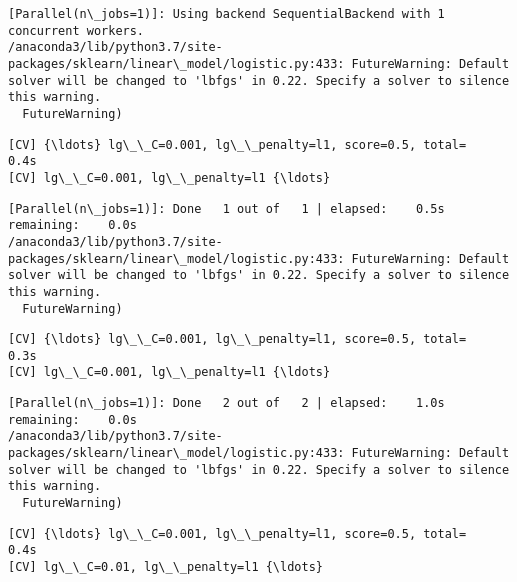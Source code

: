 \documentclass[11pt]{article}
\begin{document}
    \begin{Verbatim}[commandchars=\\\{\}]
[Parallel(n\_jobs=1)]: Using backend SequentialBackend with 1 concurrent workers.
/anaconda3/lib/python3.7/site-packages/sklearn/linear\_model/logistic.py:433: FutureWarning: Default solver will be changed to 'lbfgs' in 0.22. Specify a solver to silence this warning.
  FutureWarning)

    \end{Verbatim}

    \begin{Verbatim}[commandchars=\\\{\}]
[CV] {\ldots} lg\_\_C=0.001, lg\_\_penalty=l1, score=0.5, total=   0.4s
[CV] lg\_\_C=0.001, lg\_\_penalty=l1 {\ldots}

    \end{Verbatim}

    \begin{Verbatim}[commandchars=\\\{\}]
[Parallel(n\_jobs=1)]: Done   1 out of   1 | elapsed:    0.5s remaining:    0.0s
/anaconda3/lib/python3.7/site-packages/sklearn/linear\_model/logistic.py:433: FutureWarning: Default solver will be changed to 'lbfgs' in 0.22. Specify a solver to silence this warning.
  FutureWarning)

    \end{Verbatim}

    \begin{Verbatim}[commandchars=\\\{\}]
[CV] {\ldots} lg\_\_C=0.001, lg\_\_penalty=l1, score=0.5, total=   0.3s
[CV] lg\_\_C=0.001, lg\_\_penalty=l1 {\ldots}

    \end{Verbatim}

    \begin{Verbatim}[commandchars=\\\{\}]
[Parallel(n\_jobs=1)]: Done   2 out of   2 | elapsed:    1.0s remaining:    0.0s
/anaconda3/lib/python3.7/site-packages/sklearn/linear\_model/logistic.py:433: FutureWarning: Default solver will be changed to 'lbfgs' in 0.22. Specify a solver to silence this warning.
  FutureWarning)

    \end{Verbatim}

    \begin{Verbatim}[commandchars=\\\{\}]
[CV] {\ldots} lg\_\_C=0.001, lg\_\_penalty=l1, score=0.5, total=   0.4s
[CV] lg\_\_C=0.01, lg\_\_penalty=l1 {\ldots}

    \end{Verbatim}
\end{document}
